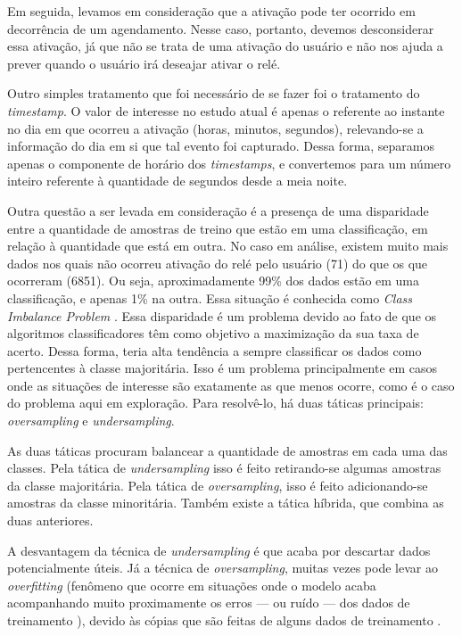			Em seguida, levamos em consideração que a ativação pode ter ocorrido em decorrência de um agendamento. Nesse caso, portanto, devemos desconsiderar essa ativação, já que não se trata de uma ativação do usuário e não nos ajuda a prever quando o usuário irá deseajar ativar o relé.

			Outro simples tratamento que foi necessário de se fazer foi o tratamento do \emph{timestamp}. O valor de interesse no estudo atual é apenas o referente ao instante no dia em que ocorreu a ativação (horas, minutos, segundos), relevando-se a informação do dia em si que tal evento foi capturado. Dessa forma, separamos apenas o componente de horário dos \emph{timestamps}, e convertemos para um número inteiro referente à quantidade de segundos desde a meia noite.

			Outra questão a ser levada em consideração é a presença de uma disparidade entre a quantidade de amostras de treino que estão em uma classificação, em relação à quantidade que está em outra. No caso em análise, existem muito mais dados nos quais não ocorreu ativação do relé pelo usuário (71) do que os que ocorreram (6851). Ou seja, aproximadamente 99\% dos dados estão em uma classificação, e apenas 1\% na outra. Essa situação é conhecida como \emph{Class Imbalance Problem} \cite{classImbalanceProblem}. Essa disparidade é um problema devido ao fato de que os algoritmos classificadores têm como objetivo a maximização da sua taxa de acerto. Dessa forma, teria alta tendência a sempre classificar os dados como pertencentes à classe majoritária. Isso é um problema principalmente em casos onde as situações de interesse são exatamente as que menos ocorre, como é o caso do problema aqui em exploração. Para resolvê-lo, há duas táticas principais: \emph{oversampling} e \emph{undersampling}. 

			As duas táticas procuram balancear a quantidade de amostras em cada uma das classes. Pela tática de \emph{undersampling} isso é feito retirando-se algumas amostras da classe majoritária. Pela tática de \emph{oversampling}, isso é feito adicionando-se amostras da classe minoritária. Também existe a tática híbrida, que combina as duas anteriores.

			A desvantagem da técnica de \emph{undersampling} é que acaba por descartar dados potencialmente úteis. Já a técnica de \emph{oversampling}, muitas vezes pode levar ao \emph{overfitting} (fenômeno que ocorre em situações onde o modelo acaba acompanhando muito proximamente os erros --- ou ruído --- dos dados de treinamento \cite{islr}), devido às cópias que são feitas de alguns dados de treinamento \cite{unbalancedClassArticle}.

